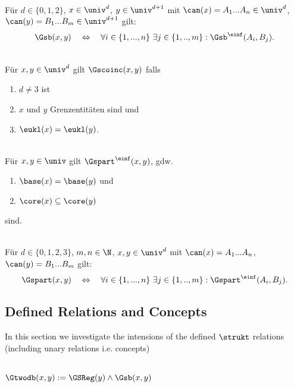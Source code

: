 \begin{dfn}[$\Gsb$]\ \\
    Für $d \in \{0,1,2\}$, $x \in \univ^d$, $y \in \univ^{d+1}$ mit $\can(x) = A_1 ... A_n \in \univ^d$, $\can(y) = B_1 ... B_m \in \univ^{d+1}$ gilt:
    \begin{align*}
        \Gsb(x,y) \quad \Leftrightarrow \quad \forall i \in \{1, ..., n\}\ \exists j \in \{1, .., m\}: \Gsb^\einf(A_i,B_j).
    \end{align*}
\end{dfn}


\begin{dfn}[$\Gscoinc$]\ \\
    Für $x,y \in \univ^d$ gilt $\Gscoinc(x,y)$ falls
    \begin{enumerate}
        \item $d \neq 3$ ist
        \item $x$ und $y$ Grenzentitäten sind und
        \item $\eukl(x) = \eukl(y)$.
    \end{enumerate}
\end{dfn}


\begin{dfn}[$\Gspart^\einf$]\ \\ 
    Für $x,y \in \univ$ gilt $\Gspart^\einf(x,y)$, gdw.
    \begin{enumerate}
        \item $\base(x) = \base(y)$ und
        \item $\core(x) \subseteq \core(y)$
    \end{enumerate}
    sind.
\end{dfn}


\begin{dfn}[$\Gspart$]\ \\
    Für $d \in \{0,1,2,3\}$, $m,n \in \N$, $x,y \in \univ^d$ mit $\can(x) = A_1 ... A_n$, $\can(y) = B_1 ... B_m$ gilt:
    $$\Gspart(x,y) \quad \Leftrightarrow \quad \forall i \in \{1, ..., n\}\ \exists j \in \{1, .., m\}: \Gspart^\einf(A_i,B_j). $$
\end{dfn}


\subsection{Defined Relations and Concepts}
In this section we investigate the intensions of the defined $\strukt$ relations (including unary relations i.e. concepts)

\begin{erin}\ \\
    $\Gtwodb(x,y) := \GSReg(y) \wedge \Gsb(x,y)$
\end{erin}

